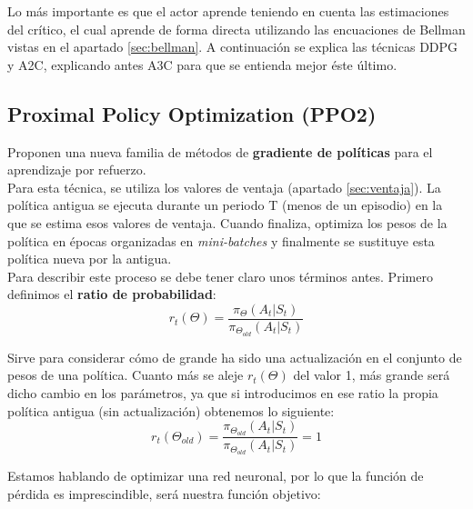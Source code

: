 \documentclass[11pt,fleqn]{book} %
\begin{document}
Lo más importante es que el actor aprende teniendo en cuenta las estimaciones del crítico, el cual aprende de forma directa utilizando las encuaciones de Bellman vistas en el apartado \ref{sec:bellman}. A continuación se explica las técnicas DDPG y A2C, explicando antes A3C para que se entienda mejor éste último.\\

\subsection{Proximal Policy Optimization (PPO2)}\label{sec:PPO2}

Proponen una nueva familia de métodos de \textbf{gradiente de políticas} \cite{article:PPO2} \cite{article:PPO2_1} para el aprendizaje por refuerzo. \\

Para esta técnica, se utiliza los valores de ventaja (apartado \ref{sec:ventaja}). La política antigua se ejecuta durante un periodo T (menos de un episodio) en la que se estima esos valores de ventaja. Cuando finaliza, optimiza los pesos de la política en épocas organizadas en \textit{mini-batches} y finalmente se sustituye esta política nueva por la antigua. \\

Para describir este proceso se debe tener claro unos términos antes. Primero definimos el \textbf{ratio de probabilidad}: \\

\begin{equation}
r_t(\Theta)=\frac{\pi_\Theta(A_t|S_t)}{\pi_{\Theta_{old}}(A_t|S_t)}
\end{equation}

Sirve para considerar cómo de grande ha sido una actualización en el conjunto de pesos de una política. Cuanto más se aleje $r_t(\Theta)$ del valor 1, más grande será dicho cambio en los parámetros, ya que si introducimos en ese ratio la propia política antigua (sin actualización) obtenemos lo siguiente: \\

\begin{equation}
r_t(\Theta_{old})=\frac{\pi_{\Theta_{old}}(A_t|S_t)}{\pi_{\Theta_{old}}(A_t|S_t)}=1
\end{equation}

Estamos hablando de optimizar una red neuronal, por lo que la función de pérdida es imprescindible, será nuestra función objetivo: \\
\end{document}
